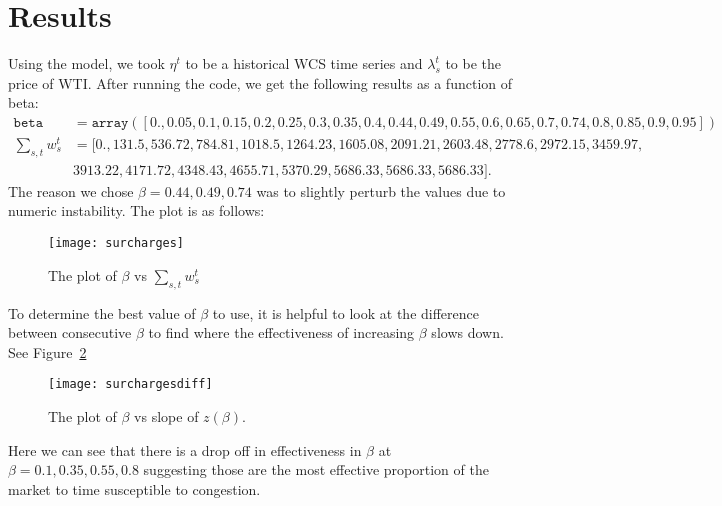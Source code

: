 \documentclass[11pt, letterpaper,nounbold]{article}
\begin{document}
\section{Results}
Using the model, we took $\eta^{t}$ to be a historical WCS time series and $\lambda_{s}^{t}$ to be the price of WTI. After running the code, we get the following results as a function of beta:
\begin{align*}
	\texttt{beta} &= \texttt{array}([0.  , 0.05, 0.1 , 0.15, 0.2 , 0.25, 0.3 , 0.35, 0.4 , 0.44, 0.49,
       0.55, 0.6 , 0.65, 0.7 , 0.74, 0.8 , 0.85, 0.9 , 0.95])\\
       	\sum_{s,t}w_{s}^{t} &=[ 0.,   131.5,   536.72,  784.81, 1018.5,  1264.23, 1605.08, 2091.21, 2603.48, 2778.6,  2972.15, 3459.97, \\
       		&3913.22, 4171.72, 4348.43, 4655.71, 5370.29, 5686.33, 5686.33, 5686.33].
       \end{align*}
The reason we chose $\beta = 0.44, 0.49, 0.74$ was to slightly perturb the values due to numeric instability. The plot is as follows:
	\begin{figure}[h!]
\centering
\texttt{[image: surcharges]}
\caption{The plot of $\beta$ vs $\sum_{s,t} w_{s}^{t}$} \label{surcharge}
\end{figure}

To determine the best value of $\beta$ to use, it is helpful to look at the difference between consecutive $\beta$ to find where the effectiveness of increasing $\beta$ slows down. See Figure~\ref{surchargediff}

	\begin{figure}[h!]
\centering
\texttt{[image: surchargesdiff]}
\caption{The plot of $\beta$ vs slope of $z(\beta)$.} \label{surchargediff}
\end{figure}
Here we can see that there is a drop off in effectiveness in $\beta$ at $\beta = 0.1, 0.35, 0.55, 0.8$ suggesting those are the most effective proportion of the market to time susceptible to congestion.


\end{document}
